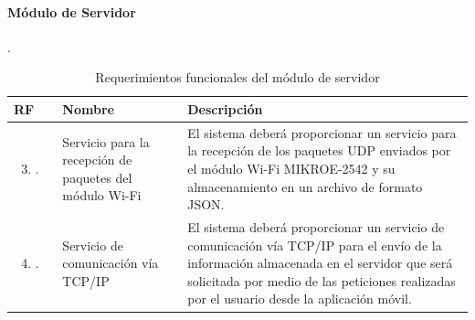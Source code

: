 \paragraph{Módulo de Servidor}.
\begin{longtable}{|M{1.6cm}|M{4.0cm}|M{6.0cm}|}
    \caption{Requerimientos funcionales del módulo de servidor}
	\hline
	\textbf{RF} & \textbf{Nombre} & \textbf{Descripción} \\ 
	\hline
 	\begin{enumerate}[label=RF\arabic*]
 	    \setcounter{enumi}{2}
 	    \item.
 	\end{enumerate}
 	& Servicio para la recepción de paquetes del módulo Wi-Fi
 	& El sistema deberá proporcionar un servicio para la recepción de los paquetes UDP enviados por el módulo Wi-Fi MIKROE-2542 y su almacenamiento en un archivo de formato JSON.\\
    \hline
    \begin{enumerate}[label=RF\arabic*]
        \setcounter{enumi}{3}
 	    \item.
 	\end{enumerate}
 	& Servicio de comunicación vía TCP/IP
 	& El sistema deberá proporcionar un servicio de comunicación vía TCP/IP para el envío de la información almacenada en el servidor que será solicitada por medio de las peticiones realizadas por el usuario desde la aplicación móvil. \\
    \hline
\end{longtable}



